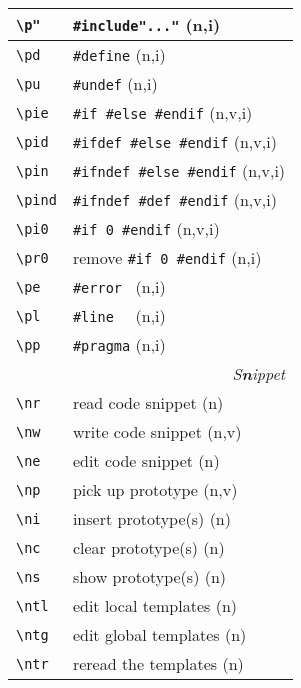 \documentclass[oneside,10pt,landscape,DIV17]{scrartcl}
\begin{document}
\begin{multicols}{3}
\begin{center}
\begin{tabular}[]{|p{11mm}|p{58mm}|}
\hline \verb'\p"'   & \verb$#include"..."$         \hfill (n,i)\\
\hline \verb'\pd'   & \verb'#define'               \hfill (n,i)\\
\hline \verb'\pu'   & \verb'#undef'                \hfill (n,i)\\
\hline \verb'\pie'  & \verb'#if #else #endif'      \hfill (n,v,i)\\
\hline \verb'\pid'  & \verb'#ifdef #else #endif'   \hfill (n,v,i)\\
\hline \verb'\pin'  & \verb'#ifndef #else #endif'  \hfill (n,v,i)\\
\hline \verb'\pind' & \verb'#ifndef #def #endif'   \hfill (n,v,i)\\
\hline \verb'\pi0'  & \verb'#if 0 #endif'          \hfill (n,v,i)\\
\hline \verb'\pr0'  & remove \verb'#if 0 #endif'   \hfill (n,i)\\
\hline \verb'\pe'   & \verb'#error '               \hfill (n,i)\\
\hline \verb'\pl'   & \verb'#line  '               \hfill (n,i)\\
\hline \verb'\pp'   & \verb'#pragma'               \hfill (n,i)\\
\hline
\hline 
\multicolumn{2}{|r|}{\textsl{S\textbf{n}ippet}} \\
\hline \verb'\nr'  & read code snippet         \hfill (n)\\
\hline \verb'\nw'  & write code snippet        \hfill (n,v)\\
\hline \verb'\ne'  & edit code snippet         \hfill (n)\\
\hline \verb'\np'  & pick up prototype         \hfill (n,v)\\
\hline \verb'\ni'  & insert prototype(s)       \hfill (n)\\
\hline \verb'\nc'  & clear  prototype(s)       \hfill (n)\\
\hline \verb'\ns'  & show   prototype(s)       \hfill (n)\\
%
\hline \verb'\ntl' & edit local templates      \hfill (n)\\
\hline \verb'\ntg' & edit global templates     \hfill (n)\\
\hline \verb'\ntr' & reread the templates      \hfill (n)\\
\hline

\end{tabular}
\end{center}
\end{multicols}
\end{document}

